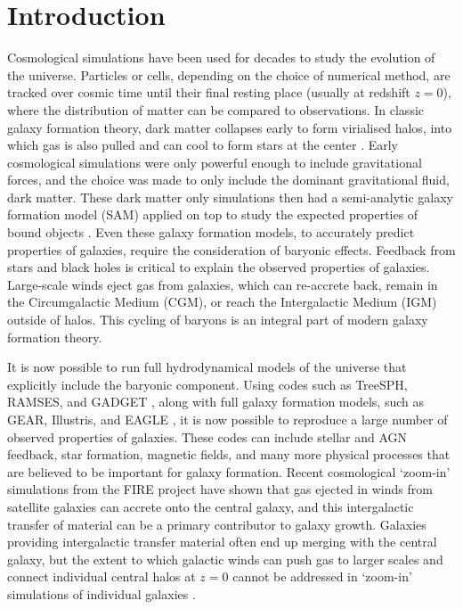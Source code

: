 \section{Introduction} \label{sec:introduction} Cosmological simulations have
been used for decades to study the evolution of the universe. Particles or
cells, depending on the choice of numerical method, are tracked over cosmic
time until their final resting place (usually at redshift $z=0$), where the
distribution of matter can be compared to observations. In classic galaxy
formation theory, dark matter collapses early to form virialised halos, into
which gas is also pulled and can cool to form stars at the center
\citep{Mo2010}. Early cosmological simulations were only powerful enough to
include gravitational forces, and the choice was made to only include the
dominant gravitational fluid, dark matter. These dark matter only simulations
\citep[see e.g.][]{Frenk1988, Springel2005a} then had a semi-analytic galaxy
formation model (SAM) applied on top to study the expected properties of bound
objects \citep[see e.g.][for modern examples of SAM frameworks]{Porter2014,
Henriques2015, Lacey2016}. Even these galaxy formation models, to accurately
predict properties of galaxies, require the consideration of baryonic effects.
Feedback from stars and black holes is critical to explain the observed
properties of galaxies. Large-scale winds eject gas from galaxies, which can
re-accrete back, remain in the Circumgalactic Medium (CGM), or reach the
Intergalactic Medium (IGM) outside of halos. This cycling of baryons is an
integral part of modern galaxy formation theory.

It is now possible to run full hydrodynamical models of the universe that
explicitly include the baryonic component. Using codes such as TreeSPH,
RAMSES, and GADGET \citep{Hernquist1989, Teyssier2002, Springel2005b}, along
with full galaxy formation models, such as GEAR, Illustris, and EAGLE
\citep{Revaz2012, Vogelsberger2014, Schaye2015}, it is now
possible to reproduce a large number of observed properties of galaxies.
These codes can include stellar and AGN feedback, star formation, magnetic
fields, and many more physical processes that are believed to be important
for galaxy formation. Recent cosmological `zoom-in' simulations from the FIRE
project \citep{Hopkins2014} have shown that gas ejected in winds from
satellite galaxies can accrete onto the central galaxy, and this
intergalactic transfer of material can be a primary contributor to galaxy
growth. Galaxies providing intergalactic transfer material often end up
merging with the central galaxy, but the extent to which galactic winds can
push gas to larger scales and connect individual central halos at $z=0$
cannot be addressed in `zoom-in' simulations of individual galaxies
\citep{AnglesAlcazar2017}.

